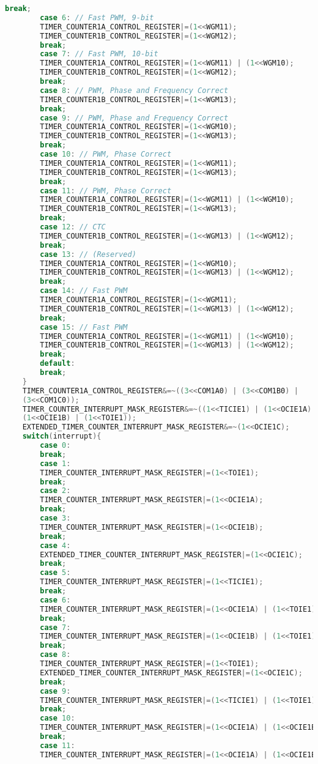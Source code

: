 \begin{lstlisting}[language=C]
		break;
		case 6:	// Fast PWM, 9-bit
		TIMER_COUNTER1A_CONTROL_REGISTER|=(1<<WGM11);
		TIMER_COUNTER1B_CONTROL_REGISTER|=(1<<WGM12);
		break;
		case 7:	// Fast PWM, 10-bit
		TIMER_COUNTER1A_CONTROL_REGISTER|=(1<<WGM11) | (1<<WGM10);
		TIMER_COUNTER1B_CONTROL_REGISTER|=(1<<WGM12);
		break;
		case 8:	// PWM, Phase and Frequency Correct
		TIMER_COUNTER1B_CONTROL_REGISTER|=(1<<WGM13);
		break;
		case 9:	// PWM, Phase and Frequency Correct
		TIMER_COUNTER1A_CONTROL_REGISTER|=(1<<WGM10);
		TIMER_COUNTER1B_CONTROL_REGISTER|=(1<<WGM13);
		break;
		case 10: // PWM, Phase Correct
		TIMER_COUNTER1A_CONTROL_REGISTER|=(1<<WGM11);
		TIMER_COUNTER1B_CONTROL_REGISTER|=(1<<WGM13);
		break;
		case 11: // PWM, Phase Correct
		TIMER_COUNTER1A_CONTROL_REGISTER|=(1<<WGM11) | (1<<WGM10);
		TIMER_COUNTER1B_CONTROL_REGISTER|=(1<<WGM13);
		break;
		case 12: // CTC
		TIMER_COUNTER1B_CONTROL_REGISTER|=(1<<WGM13) | (1<<WGM12);
		break;
		case 13: // (Reserved)
		TIMER_COUNTER1A_CONTROL_REGISTER|=(1<<WGM10);
		TIMER_COUNTER1B_CONTROL_REGISTER|=(1<<WGM13) | (1<<WGM12);
		break;
		case 14: // Fast PWM
		TIMER_COUNTER1A_CONTROL_REGISTER|=(1<<WGM11);
		TIMER_COUNTER1B_CONTROL_REGISTER|=(1<<WGM13) | (1<<WGM12);
		break;
		case 15: // Fast PWM
		TIMER_COUNTER1A_CONTROL_REGISTER|=(1<<WGM11) | (1<<WGM10);
		TIMER_COUNTER1B_CONTROL_REGISTER|=(1<<WGM13) | (1<<WGM12);
		break;
		default:
		break;
	}
	TIMER_COUNTER1A_CONTROL_REGISTER&=~((3<<COM1A0) | (3<<COM1B0) |
	(3<<COM1C0));
	TIMER_COUNTER_INTERRUPT_MASK_REGISTER&=~((1<<TICIE1) | (1<<OCIE1A) |
	(1<<OCIE1B) | (1<<TOIE1));
	EXTENDED_TIMER_COUNTER_INTERRUPT_MASK_REGISTER&=~(1<<OCIE1C);
	switch(interrupt){
		case 0:
		break;
		case 1:
		TIMER_COUNTER_INTERRUPT_MASK_REGISTER|=(1<<TOIE1);
		break;
		case 2:
		TIMER_COUNTER_INTERRUPT_MASK_REGISTER|=(1<<OCIE1A);
		break;
		case 3:
		TIMER_COUNTER_INTERRUPT_MASK_REGISTER|=(1<<OCIE1B);
		break;
		case 4:
		EXTENDED_TIMER_COUNTER_INTERRUPT_MASK_REGISTER|=(1<<OCIE1C);
		break;
		case 5:
		TIMER_COUNTER_INTERRUPT_MASK_REGISTER|=(1<<TICIE1);
		break;
		case 6:
		TIMER_COUNTER_INTERRUPT_MASK_REGISTER|=(1<<OCIE1A) | (1<<TOIE1);
		break;
		case 7:
		TIMER_COUNTER_INTERRUPT_MASK_REGISTER|=(1<<OCIE1B) | (1<<TOIE1);
		break;
		case 8:
		TIMER_COUNTER_INTERRUPT_MASK_REGISTER|=(1<<TOIE1);
		EXTENDED_TIMER_COUNTER_INTERRUPT_MASK_REGISTER|=(1<<OCIE1C);
		break;
		case 9:
		TIMER_COUNTER_INTERRUPT_MASK_REGISTER|=(1<<TICIE1) | (1<<TOIE1);
		break;
		case 10:
		TIMER_COUNTER_INTERRUPT_MASK_REGISTER|=(1<<OCIE1A) | (1<<OCIE1B) | (1<<TOIE1);
		break;
		case 11:
		TIMER_COUNTER_INTERRUPT_MASK_REGISTER|=(1<<OCIE1A) | (1<<OCIE1B) | (1<<TOIE1);

\end{lstlisting}
